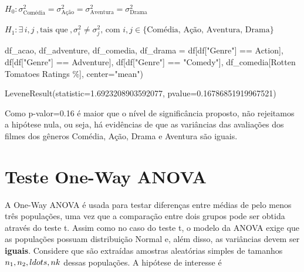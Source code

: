 \documentclass[
  letterpaper,
  DIV=11,
  numbers=noendperiod]{scrreprt}
\newenvironment{Shaded}{\begin{snugshade}}{\end{snugshade}}
\newcommand{\NormalTok}[1]{\textcolor[rgb]{0.00,0.23,0.31}{#1}}
\newcommand{\OperatorTok}[1]{\textcolor[rgb]{0.37,0.37,0.37}{#1}}
\newcommand{\StringTok}[1]{\textcolor[rgb]{0.13,0.47,0.30}{#1}}
\begin{document}
\(H_0: \sigma_{\text{Comédia}}^2 = \sigma_{\text{Ação}}^2 = \sigma_{\text{Aventura}}^2 = \sigma_{\text{Drama}}^2\)

\(H_1: \exists \, i, j \ , \text{tais que} \ , \sigma_i^2 \neq \sigma_j^2, \, \text{com } i, j \in \{\text{Comédia, Ação, Aventura, Drama}\}\)

\begin{Shaded}
\begin{Highlighting}[]
\NormalTok{df\_acao, df\_adventure, df\_comedia, df\_drama }\OperatorTok{=}\NormalTok{ df[df[}\StringTok{"Genre"}\NormalTok{] }\OperatorTok{==} \StringTok{\textquotesingle{}Action\textquotesingle{}}\NormalTok{], df[df[}\StringTok{"Genre"}\NormalTok{] }\OperatorTok{==} \StringTok{\textquotesingle{}Adventure\textquotesingle{}}\NormalTok{], df[df[}\StringTok{"Genre"}\NormalTok{] }\OperatorTok{==} \StringTok{"Comedy"}\NormalTok{], df\_comedia[}\StringTok{\textquotesingle{}Rotten Tomatoes Ratings \%\textquotesingle{}}\NormalTok{], center}\OperatorTok{=}\StringTok{"mean"}\NormalTok{)}
\end{Highlighting}
\end{Shaded}

\begin{tcolorbox}[enhanced jigsaw, breakable, leftrule=.75mm, left=2mm, opacityback=0, bottomrule=.15mm, toprule=.15mm, rightrule=.15mm, arc=.35mm, colback=white]

LeveneResult(statistic=1.6923208903592077, pvalue=0.16786851919967521)

\end{tcolorbox}

Como p-valor=0.16 é maior que o nível de significância proposto, não
rejeitamos a hipótese nula, ou seja, há evidências de que as variâncias
das avaliações dos filmes dos gêneros Comédia, Ação, Drama e Aventura
são iguais.


\hypertarget{teste-one-way-anova}{%
\chapter{Teste One-Way ANOVA}\label{teste-one-way-anova}}

A One-Way ANOVA é usada para testar diferenças entre médias de pelo
menos três populações, uma vez que a comparação entre dois grupos pode
ser obtida através do teste t. Assim como no caso do teste t, o modelo
da ANOVA exige que as populações possuam distribuição Normal e, além
disso, as variâncias devem ser \textbf{iguais}. Considere que são
extraídas amostras aleatórias simples de tamanhos
\(n_{1},n_{2},\\ldots,n{k}\) dessas populações. A hipótese de interesse
é
\end{document}
